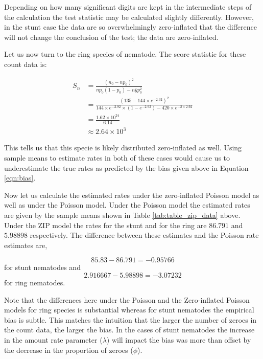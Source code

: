 \documentclass{article}
\begin{document}
Depending on how many significant digits are kept in the intermediate steps of the calculation the test statistic may be calculated slightly differently. However, in the stunt case the data are so overwhelmingly zero-inflated that the difference will not change the conclusion of the test; the data are zero-inflated. 

Let us now turn to the ring species of nematode. The score statistic for these count data is:

\begin{eqnarray}
S_n &= \frac{(n_0 - np_0)^2}{np_0(1-p_0) - n\bar{y}p_0^2}\\
&= \frac{(135 - 144\times e^{-2.92})^2 }{144\times e^{-2.92}\times (1-e^{-2.92}) - 420\times e^{-2\times2.92} }\\
&= \frac{1.62\times10^{24}}{6.14}\\
&\approx2.64\times10^{3}
\end{eqnarray}

This tells us that this specie is likely distributed zero-inflated as well. Using sample means to estimate rates in both of these cases would cause us to underestimate the true rates as predicted by the bias given above in Equation \ref{eqn:bias}. 

Now let us calculate the estimated rates under the zero-inflated Poisson model as well as under the Poisson model. Under the Poisson model the estimated rates are given by the sample means shown in Table \ref{tab:table_zip_data} above. Under the ZIP model the rates for the stunt and for the ring are $86.791$ and $5.98898$ respectively. The difference between these estimates and the Poisson rate estimates are, 

\begin{equation}
85.83 - 86.791=-0.95766
\end{equation}
for stunt nematodes and 
\begin{equation}
2.916667-5.98898=-3.07232
\end{equation}
for ring nematodes. 

Note that the differences here under the Poisson and the Zero-inflated Poisson models for ring species is substantial whereas for stunt nematodes the empirical bias is subtle. This matches the intuition that the larger the number of zeroes in the count data, the larger the bias. In the cases of stunt nematodes the increase in the amount rate parameter ($\lambda$) will impact the bias was more than offset by the decrease in the proportion of zeroes ($\phi$). 
\end{document}
